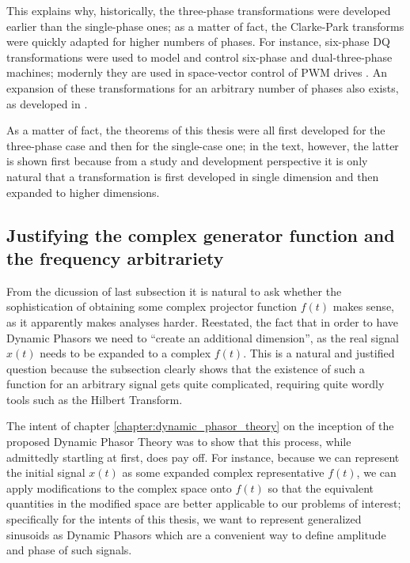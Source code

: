 	This explains why, historically, the three-phase transformations were developed earlier than the single-phase ones; as a matter of fact, the Clarke-Park transforms were quickly adapted for higher numbers of phases. For instance, six-phase DQ transformations were used to model and control six-phase and dual-three-phase machines; modernly they are used in space-vector control of PWM drives . An expansion of these transformations for an arbitrary number of phases also exists, as developed in \cite{janaszekExtendedClarkeTransformation2016}.

	As a matter of fact, the theorems of this thesis were all first developed for the three-phase case and then for the single-case one; in the text, however, the latter is shown first because from a study and development perspective it is only natural that a transformation is first developed in single dimension and then expanded to higher dimensions.

\subsection{Justifying the complex generator function and the frequency arbitrariety}\label{subsec:justifying} %

	From the dicussion of last subsection it is natural to ask whether the sophistication of obtaining some complex projector function $f(t)$ makes sense, as it apparently makes analyses harder. Reestated, the fact that in order to have Dynamic Phasors we need to ``create an additional dimension'', as the real signal $x(t)$ needs to be expanded to a complex $f(t)$. This is a natural and justified question because the subsection clearly shows that the existence of such a function for an arbitrary signal gets quite complicated, requiring quite wordly tools such as the Hilbert Transform.

	The intent of chapter \ref{chapter:dynamic_phasor_theory} on the inception of the proposed Dynamic Phasor Theory was to show that this process, while admittedly startling at first, does pay off. For instance, because we can represent the initial signal $x(t)$ as some expanded complex representative $f(t)$, we can apply modifications to the complex space onto $f(t)$ so that the equivalent quantities in the modified space are better applicable to our problems of interest; specifically for the intents of this thesis, we want to represent generalized sinusoids as Dynamic Phasors which are a convenient way to define amplitude and phase of such signals.

